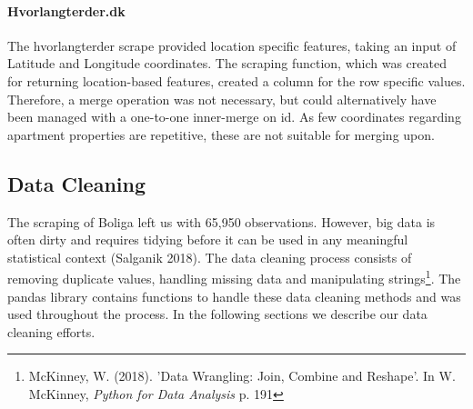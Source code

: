 \documentclass[12pt,a4paper]{article}
\begin{document}
\paragraph{Hvorlangterder.dk\newline}
The hvorlangterder scrape provided location specific features, taking an input of Latitude and Longitude coordinates. The scraping function, which was created for returning location-based features, created a column for the row specific values. Therefore, a merge operation was not necessary, but could alternatively have been managed with a one-to-one inner-merge on id. As few coordinates regarding apartment properties are repetitive, these are not suitable for merging upon. 

\subsection{Data Cleaning}
The scraping of Boliga left us with 65,950 observations. However, big data is often dirty and requires tidying before it can be used in any meaningful statistical context (Salganik 2018). The data cleaning process consists of removing duplicate values, handling missing data and manipulating strings\footnote{McKinney, W. (2018). 'Data Wrangling: Join, Combine and Reshape'. In W. McKinney, \textit{Python for Data Analysis} p. 191}. The pandas library contains functions to handle these data cleaning methods and was used throughout the process. In the following sections we describe our data cleaning efforts. 
\end{document}
